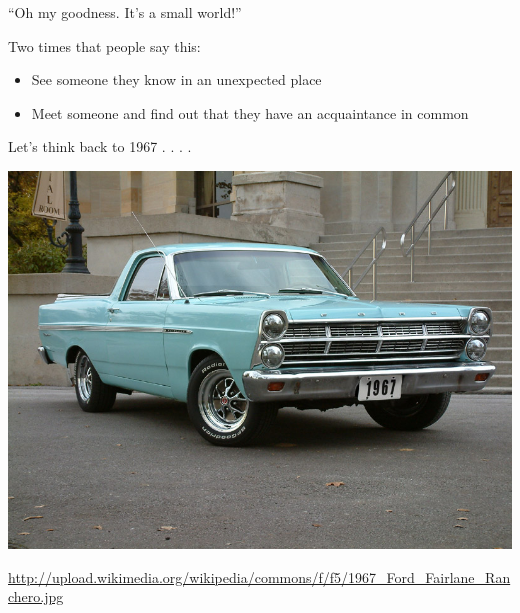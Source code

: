 \documentclass[aspectratio=169]{beamer}
\begin{document}
\begin{frame}

\begin{center}
\Large{
``Oh my goodness.  It's a small world!''
}
\end{center}

\pause
Two times that people say this:
\begin{itemize}
\item See someone they know in an unexpected place
\pause
\item Meet someone and find out that they have an acquaintance in common
\end{itemize}


\end{frame}
\begin{frame}

Let's think back to 1967 . . . . 

\end{frame}
\begin{frame}

\begin{center}
\includegraphics[height=0.8\textheight]{figures/1967_Ford_Fairlane_Ranchero.jpg}
\end{center}

\vfill
\tiny{\url{http://upload.wikimedia.org/wikipedia/commons/f/f5/1967_Ford_Fairlane_Ranchero.jpg}}

\end{frame}
\end{document}
